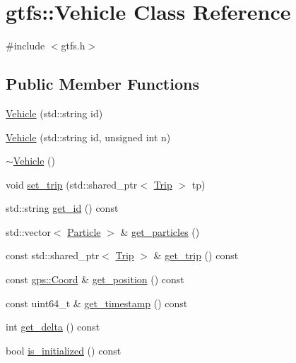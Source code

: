 \hypertarget{classgtfs_1_1Vehicle}{}\section{gtfs\+:\+:Vehicle Class Reference}
\label{classgtfs_1_1Vehicle}


{\ttfamily \#include $<$gtfs.\+h$>$}

\subsection*{Public Member Functions}
\begin{DoxyCompactItemize}
\item 
\hyperlink{classgtfs_1_1Vehicle_ac3f8111a611378f5f8b29f7465e48919}{Vehicle} (std\+::string id)
\item 
\hyperlink{classgtfs_1_1Vehicle_adf892e71483b7f9005846599fd0308e6}{Vehicle} (std\+::string id, unsigned int n)
\item 
\hyperlink{classgtfs_1_1Vehicle_a08c7450dd0df9406f78b30be044d27d8}{$\sim$\+Vehicle} ()
\item 
void \hyperlink{classgtfs_1_1Vehicle_a47ceaf4bb31c01dd4b26a12f1b7b7089}{set\+\_\+trip} (std\+::shared\+\_\+ptr$<$ \hyperlink{classgtfs_1_1Trip}{Trip} $>$ tp)
\item 
std\+::string \hyperlink{classgtfs_1_1Vehicle_a6b388986c9ed4af1eb86f13a3d2de8e0}{get\+\_\+id} () const
\item 
std\+::vector$<$ \hyperlink{classgtfs_1_1Particle}{Particle} $>$ \& \hyperlink{classgtfs_1_1Vehicle_a7b12b079c68880f00f532ca25858c368}{get\+\_\+particles} ()
\item 
const std\+::shared\+\_\+ptr$<$ \hyperlink{classgtfs_1_1Trip}{Trip} $>$ \& \hyperlink{classgtfs_1_1Vehicle_a616c83927f0d2d513d33277a9ebd3537}{get\+\_\+trip} () const
\item 
const \hyperlink{classgps_1_1Coord}{gps\+::\+Coord} \& \hyperlink{classgtfs_1_1Vehicle_a108b44eeddcd90ebae8f6391f157c503}{get\+\_\+position} () const
\item 
const uint64\+\_\+t \& \hyperlink{classgtfs_1_1Vehicle_af064609446d9cde5b1a11e9a072eac4b}{get\+\_\+timestamp} () const
\item 
int \hyperlink{classgtfs_1_1Vehicle_a23c0a191559e4066423d5f3cbfb70b46}{get\+\_\+delta} () const
\item 
bool \hyperlink{classgtfs_1_1Vehicle_ab956418d159120dd8b301d13d6fe6ec8}{is\+\_\+initialized} () const
\item 

\end{DoxyCompactItemize}
